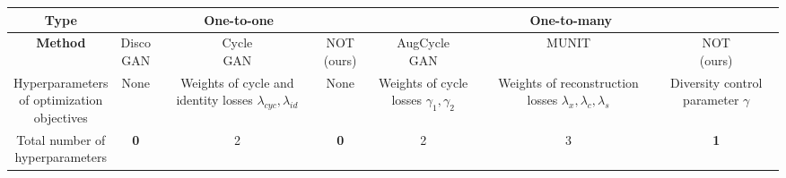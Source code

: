 \documentclass{article} %
\begin{document}
\begin{table}[!h]
\centering
\scriptsize
\begin{tabular}{|c|c|c|c|c|c|c|}
\toprule
\textbf{Type} & \multicolumn{3}{c|}{\textbf{One-to-one}} & \multicolumn{3}{c|}{\textbf{One-to-many}} \\ \midrule
\textbf{Method} & \makecell{Disco\\GAN} & \makecell{Cycle\\GAN} & \makecell{NOT\\(ours)} & \makecell{AugCycle\\GAN} & MUNIT & \makecell{NOT \\(ours)} \\ \midrule
\makecell{Hyperparameters \\
of optimization\\ objectives} & None & \makecell{Weights of \\
cycle and \\
identity losses\\
$\lambda_{cyc}, \lambda_{id}$}  & None & \makecell{Weights of \\cycle losses \\ $\gamma_{1}, \gamma_{2}$} & \makecell{Weights of \\
reconstruction \\
losses \\
$\lambda_{x}, \lambda_{c}, \lambda_{s}$} & \makecell{Diversity\\control\\parameter $\gamma$} \\ \midrule
\makecell{Total number of \\hyperparameters} & \textbf{0} & 2 & \textbf{0} & 2 & 3 & \textbf{1}
\\
\midrule

\end{tabular}
\end{table}
\end{document}
